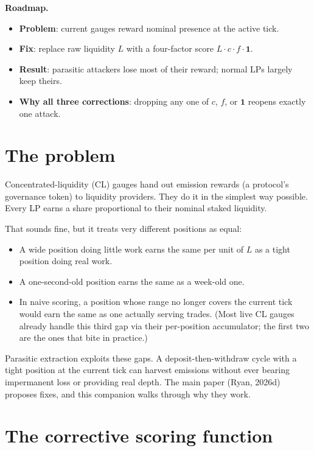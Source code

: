 \documentclass[11pt,a4paper]{article}
\begin{document}
\begin{result}
\textbf{Roadmap.}
\begin{itemize}[leftmargin=2em,nosep]
\item \textbf{Problem}: current gauges reward nominal presence at the active tick.
\item \textbf{Fix}: replace raw liquidity $L$ with a four-factor score $L \cdot c \cdot f \cdot \mathbf{1}$.
\item \textbf{Result}: parasitic attackers lose most of their reward; normal LPs largely keep theirs.
\item \textbf{Why all three corrections}: dropping any one of $c$, $f$, or $\mathbf{1}$ reopens exactly one attack.
\end{itemize}
\end{result}

\section{The problem}

Concentrated-liquidity (CL) gauges hand out emission rewards (a protocol's governance token) to liquidity providers. They do it in the simplest way possible. Every LP earns a share proportional to their nominal staked liquidity.

That sounds fine, but it treats very different positions as equal:

\begin{itemize}[leftmargin=2em]
\item A wide position doing little work earns the same per unit of $L$ as a tight position doing real work.
\item A one-second-old position earns the same as a week-old one.
\item In naive scoring, a position whose range no longer covers the current tick would earn the same as one actually serving trades. (Most live CL gauges already handle this third gap via their per-position accumulator; the first two are the ones that bite in practice.)
\end{itemize}

Parasitic extraction exploits these gaps. A deposit-then-withdraw cycle with a tight position at the current tick can harvest emissions without ever bearing impermanent loss or providing real depth. The main paper (Ryan, 2026d) proposes fixes, and this companion walks through why they work.

\section{The corrective scoring function}
\end{document}
